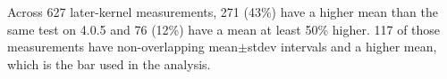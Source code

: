 Across 627 later-kernel measurements, 271 (43\%) have a higher mean than the same test on 4.0.5 and 76 (12\%) have a mean at least 50\% higher. 117 of those measurements have non-overlapping mean$\pm$stdev intervals and a higher mean, which is the bar used in the analysis.
